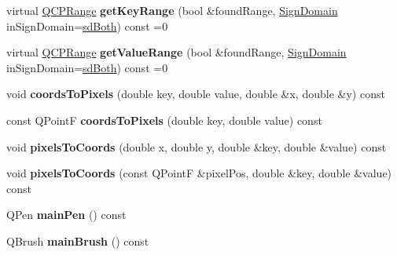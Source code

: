 \begin{DoxyCompactItemize}
virtual \hyperlink{class_q_c_p_range}{Q\+C\+P\+Range} {\bfseries get\+Key\+Range} (bool \&found\+Range, \hyperlink{class_q_c_p_abstract_plottable_a661743478a1d3c09d28ec2711d7653d8}{Sign\+Domain} in\+Sign\+Domain=\hyperlink{class_q_c_p_abstract_plottable_a661743478a1d3c09d28ec2711d7653d8a082b98cfb91a7363a3b5cd17b0c1cd60}{sd\+Both}) const =0
\item 
\hypertarget{class_q_c_p_abstract_plottable_aa3331b415b5939fe4df60b78831b2799}{}\label{class_q_c_p_abstract_plottable_aa3331b415b5939fe4df60b78831b2799} 
virtual \hyperlink{class_q_c_p_range}{Q\+C\+P\+Range} {\bfseries get\+Value\+Range} (bool \&found\+Range, \hyperlink{class_q_c_p_abstract_plottable_a661743478a1d3c09d28ec2711d7653d8}{Sign\+Domain} in\+Sign\+Domain=\hyperlink{class_q_c_p_abstract_plottable_a661743478a1d3c09d28ec2711d7653d8a082b98cfb91a7363a3b5cd17b0c1cd60}{sd\+Both}) const =0
\item 
\hypertarget{class_q_c_p_abstract_plottable_a7ad84a36472441cf1f555c5683d0da93}{}\label{class_q_c_p_abstract_plottable_a7ad84a36472441cf1f555c5683d0da93} 
void {\bfseries coords\+To\+Pixels} (double key, double value, double \&x, double \&y) const
\item 
\hypertarget{class_q_c_p_abstract_plottable_a5acb50ae984eef09a7ab92315d2ad708}{}\label{class_q_c_p_abstract_plottable_a5acb50ae984eef09a7ab92315d2ad708} 
const Q\+PointF {\bfseries coords\+To\+Pixels} (double key, double value) const
\item 
\hypertarget{class_q_c_p_abstract_plottable_a3903c1120ab5c27e7fa46b597ef267bd}{}\label{class_q_c_p_abstract_plottable_a3903c1120ab5c27e7fa46b597ef267bd} 
void {\bfseries pixels\+To\+Coords} (double x, double y, double \&key, double \&value) const
\item 
\hypertarget{class_q_c_p_abstract_plottable_a28d32c0062b9450847851ffdee1c5f69}{}\label{class_q_c_p_abstract_plottable_a28d32c0062b9450847851ffdee1c5f69} 
void {\bfseries pixels\+To\+Coords} (const Q\+PointF \&pixel\+Pos, double \&key, double \&value) const
\item 
\hypertarget{class_q_c_p_abstract_plottable_abd790a3b229239f49067f136633a4b98}{}\label{class_q_c_p_abstract_plottable_abd790a3b229239f49067f136633a4b98} 
Q\+Pen {\bfseries main\+Pen} () const
\item 
\hypertarget{class_q_c_p_abstract_plottable_ac9147022a662e92b46c39e7cb821b0af}{}\label{class_q_c_p_abstract_plottable_ac9147022a662e92b46c39e7cb821b0af} 
Q\+Brush {\bfseries main\+Brush} () const
\item 
\hypertarget{class_q_c_p_abstract_plottable_a8d06a59ea23324cce6330ebf2262c0ed}{}\label{class_q_c_p_abstract_plottable_a8d06a59ea23324cce6330ebf2262c0ed} 

\end{DoxyCompactItemize}
